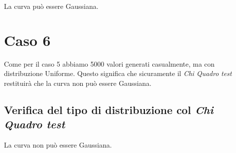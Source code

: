 \documentclass[a4paper]{article}
\begin{document}
La curva può essere Gaussiana.

\section{Caso 6}
Come per il caso 5 abbiamo 5000 valori generati casualmente, ma con distribuzione Uniforme. 
Questo significa che sicuramente il \emph{Chi Quadro test} restituirà che la curva non può essere Gaussiana.
\\
\subsection{Verifica del tipo di distribuzione col \emph{Chi Quadro test}}

La curva non può essere Gaussiana.
\end{document}
